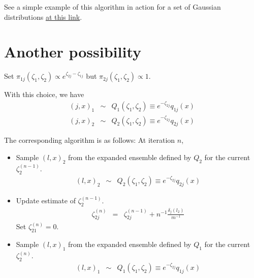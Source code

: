 \documentclass[aps,pre,twocolumn,nofootinbib,superscriptaddress,linenumbers,11point]{revtex4-1}
\begin{document}
See a simple example of this algorithm in action for a set of Gaussian distributions \href{https://github.com/choderalab/perses/blob/master/notebooks/Harmonic%20oscillators%20example.ipynb}{at this link}.


\section*{Another possibility}
\label{section:another-possibility}

Set $\pi_{1j}(\zeta_1,\zeta_2) \propto e^{\zeta_{2j} -\zeta_{1j}}$ but $\pi_{2j}(\zeta_1,\zeta_2) \propto 1$.

With this choice, we have
\begin{eqnarray}
(j, x)_1 &\sim& Q_1(\zeta_1, \zeta_2) \equiv e^{-\zeta_{2j}} q_{1j}(x) \\
(j, x)_2 &\sim& Q_2(\zeta_1, \zeta_2) \equiv e^{-\zeta_{2j}} q_{2j}(x)
\end{eqnarray}

The corresponding algorithm is as follows:
At iteration $n$,
\begin{itemize}
  \item Sample $(l, x)_2$ from the expanded ensemble defined by $Q_2$ for the current $\zeta_2^{(n-1)}$.
  \begin{eqnarray}
  (l, x)_2 &\sim& Q_2(\zeta_1,\zeta_2) \equiv e^{-\zeta_{2j}} q_{2j}(x)
  \end{eqnarray}
  \item Update estimate of $\zeta_2^{(n-1)}$.
  \begin{eqnarray}
  \zeta_{2j}^{(n)} &=& \zeta_{2j}^{(n-1)} + n^{-1} \frac{\delta_j(l_2)}{m^{-1}}
  \end{eqnarray}
  Set $\zeta_{21}^{(n)} = 0$.
  \item Sample $(l, x)_1$ from the expanded ensemble defined by $Q_1$ for the current $\zeta_2^{(n)}$.
  \begin{eqnarray}
  (l, x)_1 &\sim& Q_1(\zeta_1,\zeta_2) \equiv e^{-\zeta_{2j}} q_{1j}(x)
  \end{eqnarray}
\end{itemize}

\end{document}

